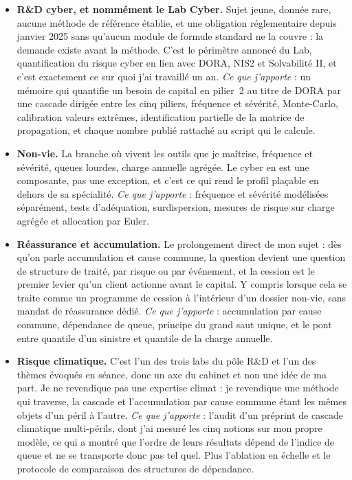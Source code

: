\documentclass[11pt,a4paper]{article}
\begin{document}
\begin{itemize}
\item \textbf{R\&D cyber, et nommément le Lab Cyber.} Sujet jeune, donnée rare, aucune
      méthode de référence établie, et une obligation réglementaire depuis janvier 2025 sans
      qu'aucun module de formule standard ne la couvre : la demande existe avant la méthode.
      C'est le périmètre annoncé du Lab, quantification du risque cyber en lien avec DORA,
      NIS2 et Solvabilité II, et c'est exactement ce sur quoi j'ai travaillé un an.
      \textit{Ce que j'apporte} : un mémoire qui quantifie un besoin de capital en pilier~2
      au titre de DORA par une cascade dirigée entre les cinq piliers, fréquence et sévérité,
      Monte-Carlo, calibration valeurs extrêmes, identification partielle de la matrice de
      propagation, et chaque nombre publié rattaché au script qui le calcule.
\item \textbf{Non-vie.} La branche où vivent les outils que je maîtrise, fréquence et
      sévérité, queues lourdes, charge annuelle agrégée. Le cyber en est une composante, pas
      une exception, et c'est ce qui rend le profil plaçable en dehors de sa spécialité.
      \textit{Ce que j'apporte} : fréquence et sévérité modélisées séparément, tests
      d'adéquation, surdispersion, mesures de risque sur charge agrégée et allocation par
      Euler.
\item \textbf{Réassurance et accumulation.} Le prolongement direct de mon sujet : dès qu'on
      parle accumulation et cause commune, la question devient une question de structure de
      traité, par risque ou par événement, et la cession est le premier levier qu'un client
      actionne avant le capital. Y compris lorsque cela se traite comme un programme de
      cession à l'intérieur d'un dossier non-vie, sans mandat de réassurance dédié.
      \textit{Ce que j'apporte} : accumulation par cause commune, dépendance de queue,
      principe du grand saut unique, et le pont entre quantile d'un sinistre et quantile de
      la charge annuelle.
\item \textbf{Risque climatique.} C'est l'un des trois labs du pôle R\&D et l'un des thèmes
      évoqués en séance, donc un axe du cabinet et non une idée de ma part. Je ne revendique pas
      une expertise climat : je revendique une méthode qui traverse, la cascade et l'accumulation
      par cause commune étant les mêmes objets d'un péril à l'autre.
      \textit{Ce que j'apporte} : l'audit d'un préprint de cascade climatique multi-périls, dont
      j'ai mesuré les cinq notions sur mon propre modèle, ce qui a montré que l'ordre de leurs
      résultats dépend de l'indice de queue et ne se transporte donc pas tel quel. Plus
      l'ablation en échelle et le protocole de comparaison des structures de dépendance.
\end{itemize}
\end{document}
